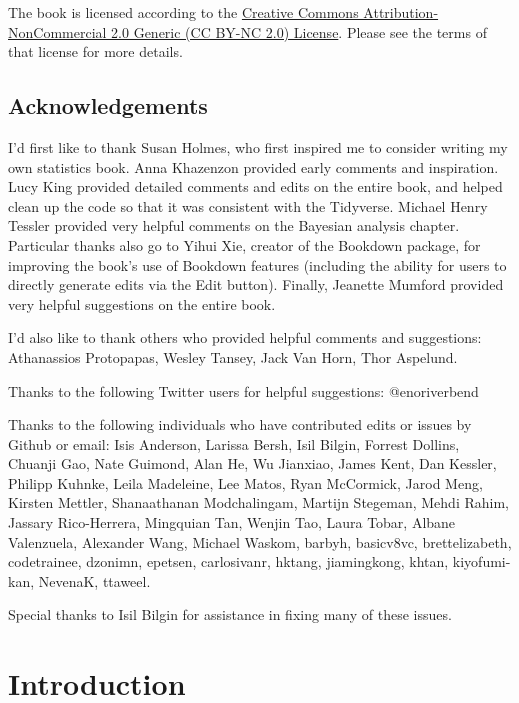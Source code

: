 \documentclass[
  12pt,
]{book}
\begin{document}
The book is licensed according to the \href{https://creativecommons.org/licenses/by-nc/2.0/}{Creative Commons Attribution-NonCommercial 2.0 Generic (CC BY-NC 2.0) License}. Please see the terms of that license for more details.

\hypertarget{acknowledgements}{%
\section{Acknowledgements}\label{acknowledgements}}

I'd first like to thank Susan Holmes, who first inspired me to consider writing my own statistics book. Anna Khazenzon provided early comments and inspiration. Lucy King provided detailed comments and edits on the entire book, and helped clean up the code so that it was consistent with the Tidyverse. Michael Henry Tessler provided very helpful comments on the Bayesian analysis chapter. Particular thanks also go to Yihui Xie, creator of the Bookdown package, for improving the book's use of Bookdown features (including the ability for users to directly generate edits via the Edit button). Finally, Jeanette Mumford provided very helpful suggestions on the entire book.

I'd also like to thank others who provided helpful comments and suggestions: Athanassios Protopapas, Wesley Tansey, Jack Van Horn, Thor Aspelund.

Thanks to the following Twitter users for helpful suggestions: @enoriverbend

Thanks to the following individuals who have contributed edits or issues by Github or email:
Isis Anderson, Larissa Bersh, Isil Bilgin, Forrest Dollins, Chuanji Gao, Nate Guimond, Alan He, Wu Jianxiao, James Kent, Dan Kessler, Philipp Kuhnke, Leila Madeleine, Lee Matos, Ryan McCormick, Jarod Meng, Kirsten Mettler, Shanaathanan Modchalingam, Martijn Stegeman, Mehdi Rahim, Jassary Rico-Herrera, Mingquian Tan, Wenjin Tao, Laura Tobar, Albane Valenzuela, Alexander Wang, Michael Waskom,
barbyh, basicv8vc, brettelizabeth, codetrainee, dzonimn, epetsen, carlosivanr, hktang, jiamingkong, khtan, kiyofumi-kan, NevenaK, ttaweel.

Special thanks to Isil Bilgin for assistance in fixing many of these issues.

\hypertarget{introduction}{%
\chapter{Introduction}\label{introduction}}
\end{document}
